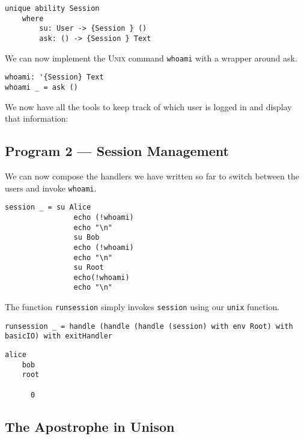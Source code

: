 \documentclass[logo,bsc,singlespacing,parskip]{infthesis}
\begin{document}
\begin{lstlisting}[language=unison]
unique ability Session
    where
        su: User -> {Session } ()
        ask: () -> {Session } Text
\end{lstlisting}

We can now implement the \textsc{Unix} command \texttt{whoami} with a wrapper
around ask.

\begin{lstlisting}[language=unison]
whoami: '{Session} Text
whoami _ = ask ()
\end{lstlisting}

We now have all the tools to keep track of which user is logged in and display
that information:

\begin{tcolorbox}[colback=gray!10, colframe=black, arc=0pt, outer arc=0pt]
  \section*{Program 2 --- Session Management}
  
  We can now compose the handlers we have written so far to switch between the
  users and invoke \texttt{whoami}.

  \begin{lstlisting}[language=unison]
    session _ = su Alice
                echo (!whoami)
                echo "\n"
                su Bob
                echo (!whoami)
                echo "\n"
                su Root
                echo(!whoami)
                echo "\n"
  \end{lstlisting}

  The function \texttt{runsession} simply invokes \texttt{session} using our
  \texttt{unix} function.

  \begin{lstlisting}[language=unison]
    runsession _ = handle (handle (handle (session) with env Root) with basicIO) with exitHandler
  \end{lstlisting}

  \begin{lstlisting}[style=terminal]
    alice
    bob
    root
      
      0
\end{lstlisting}
\end{tcolorbox}

\subsection{The Apostrophe in Unison}
\end{document}
